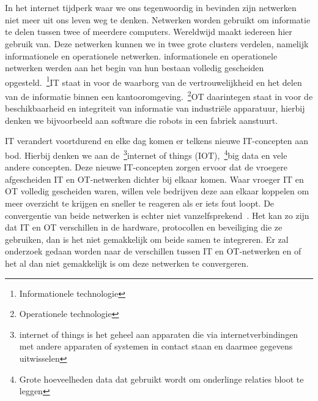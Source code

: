 
\chapter{}
\label{ch:inleiding}
In het internet tijdperk waar we ons tegenwoordig in bevinden zijn netwerken niet meer uit ons leven weg te denken. Netwerken worden gebruikt om informatie te delen tussen twee of meerdere computers. Wereldwijd maakt iedereen hier gebruik van. Deze netwerken kunnen we in twee grote clusters verdelen, namelijk informationele en operationele netwerken. informationele en operationele netwerken werden aan het begin van hun bestaan volledig gescheiden opgesteld.~\footnote{Informationele technologie}IT staat in voor de waarborg van de vertrouwelijkheid en het delen van de informatie binnen een kantooromgeving.~\footnote{Operationele technologie}OT daarintegen staat in voor de beschikbaarheid en integriteit van informatie van industriële apparatuur, hierbij denken we bijvoorbeeld aan software die robots in een fabriek aanstuurt.


IT verandert voortdurend en elke dag komen er telkens nieuwe IT-concepten aan bod. Hierbij denken we aan de~\footnote{internet of things is het geheel aan apparaten die via internetverbindingen met andere apparaten of systemen in contact staan en daarmee gegevens uitwisselen}internet of things (IOT),~\footnote{Grote hoeveelheden data dat gebruikt wordt om onderlinge relaties bloot te leggen}big data en vele andere concepten. Deze nieuwe IT-concepten zorgen ervoor dat de vroegere afgescheiden IT en OT-netwerken dichter bij elkaar komen. Waar vroeger IT en OT volledig gescheiden waren, willen vele bedrijven deze aan elkaar koppelen om meer overzicht te krijgen en sneller te reageren als er iets fout loopt. De convergentie van beide netwerken is echter niet vanzelfsprekend~\autocite{Hayes2020}. Het kan zo zijn dat IT en OT verschillen in de hardware, protocollen en beveiliging die ze gebruiken, dan is het niet gemakkelijk om beide samen te integreren. Er zal onderzoek gedaan worden naar de verschillen tussen IT en OT-netwerken en of het al dan niet gemakkelijk is om deze netwerken te convergeren.

